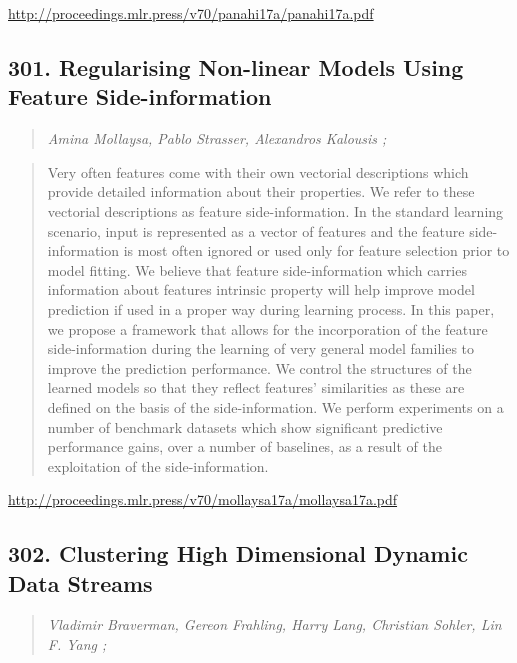 \documentclass{article}
\begin{document}
\href{http://proceedings.mlr.press/v70/panahi17a/panahi17a.pdf}{http://proceedings.mlr.press/v70/panahi17a/panahi17a.pdf}

\subsection{301. Regularising Non-linear Models Using Feature Side-information}

\begin{quote}
\footnotesize{\textit{Amina Mollaysa, Pablo Strasser, Alexandros Kalousis ;}}

\end{quote}

\begin{quote}
    Very often features come with their own vectorial descriptions which provide detailed information about their properties. We refer to these vectorial descriptions as feature side-information. In the standard learning scenario, input is represented as a vector of features and the feature side-information is most often ignored or used only for feature selection prior to model fitting. We believe that feature side-information which carries information about features intrinsic property will help improve model prediction if used in a proper way during learning process. In this paper, we propose a framework that allows for the incorporation of the feature side-information during the learning of very general model families to improve the prediction performance. We control the structures of the learned models so that they reflect features’ similarities as these are defined on the basis of the side-information. We perform experiments on a number of benchmark datasets which show significant predictive performance gains, over a number of baselines, as a result of the exploitation of the side-information.  
\end{quote}

\href{http://proceedings.mlr.press/v70/mollaysa17a/mollaysa17a.pdf}{http://proceedings.mlr.press/v70/mollaysa17a/mollaysa17a.pdf}

\subsection{302. Clustering High Dimensional Dynamic Data Streams}

\begin{quote}
\footnotesize{\textit{Vladimir Braverman, Gereon Frahling, Harry Lang, Christian Sohler, Lin F. Yang ;}}

\end{quote}
\end{document}
